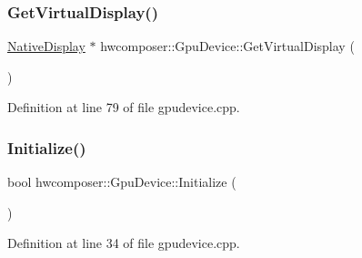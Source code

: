 \subsubsection{\texorpdfstring{Get\+Virtual\+Display()}{GetVirtualDisplay()}}
{\footnotesize\ttfamily \mbox{\hyperlink{classhwcomposer_1_1NativeDisplay}{Native\+Display}} $\ast$ hwcomposer\+::\+Gpu\+Device\+::\+Get\+Virtual\+Display (\begin{DoxyParamCaption}{ }\end{DoxyParamCaption})}



Definition at line 79 of file gpudevice.\+cpp.


\begin{DoxyCode}{0}
\end{DoxyCode}
\mbox{\label{classhwcomposer_1_1GpuDevice_a794b3bd7590853c44f59e32252d2b3d7}} 
\subsubsection{\texorpdfstring{Initialize()}{Initialize()}}
{\footnotesize\ttfamily bool hwcomposer\+::\+Gpu\+Device\+::\+Initialize (\begin{DoxyParamCaption}{ }\end{DoxyParamCaption})}



Definition at line 34 of file gpudevice.\+cpp.


